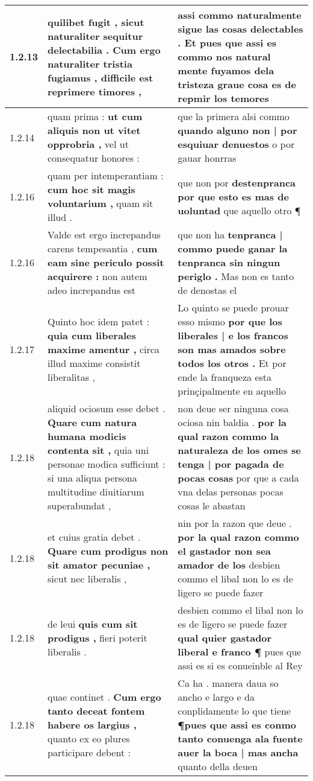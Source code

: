\begin{tabular}{|p{1cm}|p{6.5cm}|p{6.5cm}|}
1.2.13 & quilibet fugit , sicut naturaliter sequitur delectabilia . \textbf{ Cum ergo naturaliter tristia fugiamus , } difficile est reprimere timores , & assi commo naturalmente sigue las cosas delectables . \textbf{ Et pues que assi es commo nos natural mente fuyamos dela tristeza } graue cosa es de repmir los temores \\\hline
1.2.14 & quam prima : \textbf{ ut cum aliquis non ut vitet opprobria , } vel ut consequatur honores : & que la primera alsi commo \textbf{ quando alguno non | por esquiuar denuestos } o por gauar honrras \\\hline
1.2.16 & quam per intemperantiam : \textbf{ cum hoc sit magis voluntarium , } quam sit illud . & que non por \textbf{ destenpranca por que esto es mas de uoluntad } que aquello otro ¶ \\\hline
1.2.16 & Valde est ergo increpandus carens tempesantia , \textbf{ cum eam sine periculo possit acquirere : } non autem adeo increpandus est & que non ha \textbf{ tenpranca | commo puede ganar la tenpranca sin ningun periglo . } Mas non es tanto de denostas el \\\hline
1.2.17 & Quinto hoc idem patet : \textbf{ quia cum liberales maxime amentur , } circa illud maxime consistit liberalitas , & Lo quinto se puede prouar esso mismo \textbf{ por que los liberales | e los francos son mas amados sobre todos los otros . } Et por ende la franqueza esta prinçipalmente en aquello \\\hline
1.2.18 & aliquid ociosum esse debet . \textbf{ Quare cum natura humana modicis contenta sit , } quia uni personae modica sufficiunt : si una aliqua persona multitudine diuitiarum superabundat , & non deue ser ninguna cosa ociosa nin baldia . \textbf{ por la qual razon commo la naturaleza de los omes se tenga | por pagada de pocas cosas } por que a cada vna delas personas pocas cosas le abastan \\\hline
1.2.18 & et cuius gratia debet . \textbf{ Quare cum prodigus non sit amator pecuniae , } sicut nec liberalis , & nin por la razon que deue . \textbf{ por la qual razon commo el gastador non sea amador de los } desbien commo el libal non lo es de ligero se puede fazer \\\hline
1.2.18 & de leui \textbf{ quis cum sit prodigus , } fieri poterit liberalis . & desbien commo el libal non lo es de ligero se puede fazer \textbf{ qual quier gastador liberal e franco ¶ } pues que assi es si es conueinble al Rey \\\hline
1.2.18 & quae continet . \textbf{ Cum ergo tanto deceat fontem habere os largius , } quanto ex eo plures participare debent : & Ca ha . manera daua so ancho e largo e da conplidamente lo que tiene \textbf{ ¶pues que assi es conmo tanto conuenga ala fuente auer la boca | mas ancha } quanto della deuen \\\hline

\end{tabular}
